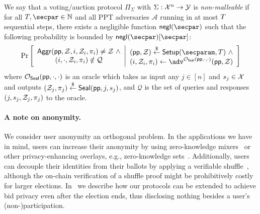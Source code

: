 \begin{definition}\label{def:non_malleability}
We say that a voting/auction protocol $\Pi_\Sigma$ with $\Sigma: \mathcal{X}^n \to \mathcal{Y}$ is \emph{non-malleable} if for all $\Ttime,\secpar \in \mathbb{N}$ and all PPT adversaries $\mathcal{A}$ running in at most $T$ sequential steps, there exists a negligible function $\negl$ such that the following probability is bounded by $\negl[\secpar]$:
\begin{align*}
    \Pr\left[
        \begin{array}{c}
        \Aggr(\pp, \Z, i, \Z_i, \pi_i) \neq \Z~\land\\
        (i, \cdot, \Z_i, \pi_i) \notin \mathcal{Q}
        \end{array}
        \middle|
        \begin{array}{c}
            (\pp, \Z) \sample \Setup(\secparam, \Ttime)~\land\\
            (i, \Z_i, \pi_i) \gets \adv^{\mathcal{O}_\Seal(\pp,\cdot,\cdot)}(\pp, \Z)
        \end{array}
    \right]
\end{align*}
where $\mathcal{O}_{\mathsf{Seal}}(\mathsf{pp}, \cdot,\cdot)$ is an oracle which takes as input any $j \in [n]$ and $s_j \in \mathcal{X}$ and outputs $(\mathcal{Z}_j, \pi_j) \stackrel{\$}{\gets} \mathsf{Seal}(\mathsf{pp}, j, s_j)$, and $\mathcal{Q}$ is the set of queries and responses $(j, s_j, \mathcal{Z}_j, \pi_j)$ to the oracle.
\end{definition}

\paragraph{A note on anonymity.} 
We consider user anonymity an orthogonal problem. In the applications we have in mind, users can increase their anonymity by using zero-knowledge mixers~\cite{PerSemSto19} or other privacy-enhancing overlays, e.g., zero-knowledge sets~\cite{semaphore}. Additionally, users can decouple their identities from their ballots by applying a verifiable shuffle~\cite{CCS:Neff01}, although the on-chain verification of a shuffle proof might be prohibitively costly for larger elections. 
In~ we describe how our protocols can be extended to achieve bid privacy even after the election ends, thus disclosing nothing besides a user's (non-)participation.

